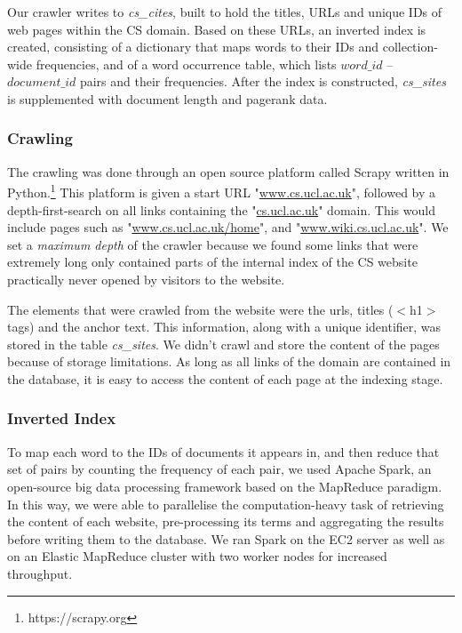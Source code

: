 Our crawler writes to \emph{cs\_cites}, built to hold the titles, URLs and unique IDs of web pages within the CS domain.
Based on these URLs, an inverted index is created, consisting of a dictionary that maps words to their IDs and collection-wide frequencies, and of a word occurrence table, which lists $word\_id$ -- $document\_id$ pairs and their frequencies. After the index is constructed, \emph{cs\_sites} is supplemented with document length and pagerank data.


\subsubsection{Crawling} %
\label{ssub:crawling}

The crawling was done through an open source platform called Scrapy written in Python.\footnote{https://scrapy.org} This platform is given a start URL "\url{www.cs.ucl.ac.uk}", followed by a depth-first-search on all links containing the "\url{cs.ucl.ac.uk}" domain. This would include pages such as "\url{www.cs.ucl.ac.uk/home}", and "\url{www.wiki.cs.ucl.ac.uk}". We set a \emph{maximum depth} of the crawler because we found some links that were extremely long only contained parts of the internal index of the CS website practically never opened by visitors to the website.

The elements that were crawled from the website were the urls, titles ($<$h1$>$ tags) and the anchor text. This information, along with a unique identifier, was stored in the table \emph{cs\_sites}. We didn't crawl and store the content of the pages because of storage limitations. As long as all links of the domain are contained in the database, it is easy to access the content of each page at the indexing stage.


\subsubsection{Inverted Index} %
\label{ssub:inverted_index}

To map each word to the IDs of documents it appears in, and then reduce that set of pairs by counting the frequency of each pair, we used Apache Spark, an open-source big data processing framework based on the MapReduce paradigm. In this way, we were able to parallelise the computation-heavy task of retrieving the content of each website, pre-processing its terms and aggregating the results before writing them to the database. We ran Spark on the EC2 server as well as on an Elastic MapReduce cluster with two worker nodes for increased throughput.

